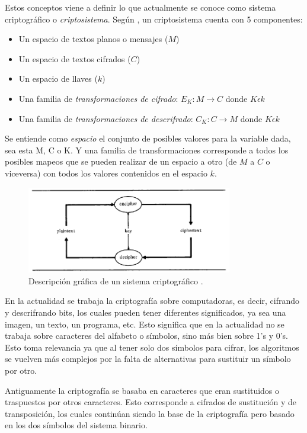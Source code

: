 Estos conceptos viene a definir lo que actualmente se conoce como sistema criptográfico o \textit{criptosistema}. Según \cite{denning}, un criptosistema cuenta con 5 componentes:
\begin{itemize}
\item Un espacio de textos planos o mensajes ($M$)
\item Un espacio de textos cifrados ($C$)
\item Un espacio de llaves ($k$)
\item Una familia de \textit{transformaciones de cifrado}: $E_K: M\rightarrow C$ donde $K \epsilon  k$
\item Una familia de \textit{transformaciones de descrifrado}: $C_K: C\rightarrow M$ donde $K \epsilon  k$
\end{itemize} 


Se entiende como \textit{espacio} el conjunto de posibles valores para la variable dada, sea esta M, C o K.
Y una familia de transformaciones corresponde a todos los posibles mapeos que se pueden realizar de un espacio a otro (de $M$ a $C$ o viceversa) con todos los valores contenidos en el espacio $k$.

\begin{figure}
	\centering
	\includegraphics[width=0.8\textwidth]{./images/figExplicacionSistemaCripto}
	\caption{Descripción gráfica de un sistema criptográfico \citep{denning}.}
	\label{figExplicacionSistemaCripto}
\end{figure}


En la actualidad se trabaja la criptografía sobre computadoras, es decir, cifrando y descrifrando bits, los cuales pueden tener diferentes significados, ya sea una imagen, un texto, un programa, etc. Esto significa que en la actualidad no se trabaja sobre caracteres del alfabeto o símbolos, sino más bien sobre 1's y 0's. Esto toma relevancia ya que al tener solo dos símbolos para cifrar, los algoritmos se vuelven más complejos por la falta de alternativas para sustituir un símbolo por otro.

Antiguamente la criptografía se basaba en caracteres que eran sustituidos o traspuestos por otros caracteres. Esto corresponde a cifrados de sustitución y de transposición, los cuales continúan siendo la base de la criptografía pero basado en los dos símbolos del sistema binario.

